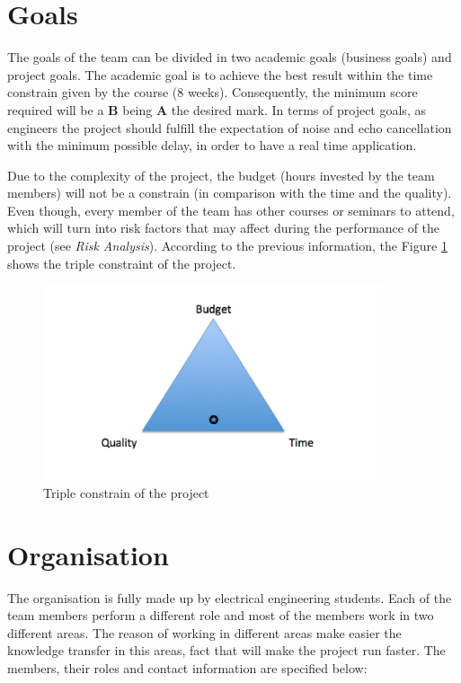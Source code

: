 \documentclass[11pt]{article}
\begin{document}
\section{Goals}

The goals of the team can be divided in two academic goals (business goals) and project goals. The academic goal is to achieve the best result within the time constrain given by the course (8 weeks). Consequently, the minimum score required will be a \textbf{B} being \textbf{A} the desired mark. In terms of project goals, as engineers the project should fulfill the expectation of noise and echo cancellation with the minimum possible delay, in order to have a real time application.

Due to the complexity of the project, the budget (hours invested by the team members) will not be a constrain (in comparison with the time and the quality). Even though, every member of the team has other courses or seminars to attend, which will turn into risk factors that may affect during the performance of the project (see \textit{Risk Analysis}). According to the previous information, the Figure \ref{3_const} shows the triple constraint of the project.

		\begin{figure}[h]
		\centering
		\includegraphics[width=10cm]{tripleconstrain}
		\caption{Triple constrain of the project}
		\label{3_const}
		\end{figure}

\section{Organisation}

The organisation is fully made up by electrical engineering students. Each of the team members perform a different role and most of the members work in two different areas. The reason of working in different areas make easier the knowledge transfer in this areas, fact that will make the project run faster. The members, their roles and contact information are specified below:
\end{document}
